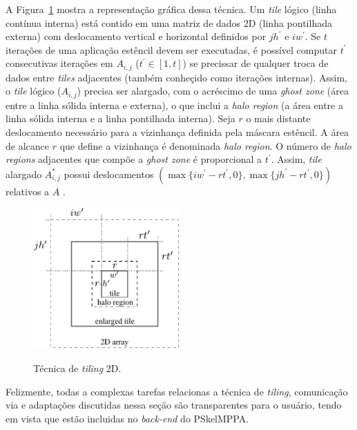 A Figura~\ref{fig:gputile} mostra a representação gráfica dessa técnica. Um \emph{tile} lógico (linha contínua interna) está contido em uma matriz de dados 2D (linha pontilhada externa) com deslocamento vertical e horizontal definidos por $j h^\prime$ e $i w^\prime$. Se $t$ iterações de uma aplicação estêncil devem ser executadas, é possível computar $t^\prime$ consecutivas iterações em $A_{i,j}$ ($t^\prime \in \left[1,t\right]$) se precissar de qualquer troca de dados entre \emph{tiles} adjacentes (também conheçido como iterações internas). Assim, o \emph{tile} lógico ($A_{i,j}$) precisa ser alargado, com o acréscimo de uma \emph{ghost zone} (área entre a linha sólida interna e externa), o que inclui a \emph{halo region} (a área entre a linha sólida interna e a linha pontilhada interna). Seja $r$ o mais distante deslocamento necessário para a vizinhança definida pela máscara estêncil. A área de alcance $r$ que define a vizinhança é denominada \textit{halo region}. O número de \emph{halo regions} adjacentes que compõe a \emph{ghost zone} é proporcional a $t^\prime$.
%
Assim, \emph{tile} alargado $A^\ast_{i,j}$ possui deslocamentos $(\max\{iw^\prime - rt^\prime, 0\}, \max\{jh^\prime - rt^\prime, 0\})$ relativos a $A$ \cite{Podesta:TCC}. 

\begin{figure}
	\centering
	\caption{Técnica de \textit{tiling} 2D.}
	\includegraphics[width=0.5\textwidth]{figs/tile.pdf} \\
	\label{fig:gputile}
\end{figure}

Felizmente, todas a complexas tarefas relacionas a técnica de \textit{tiling}, comunicação via \noc e adaptações discutidas nessa seção são transparentes para o usuário, tendo em vista que estão incluidas no \emph{back-end} do PSkelMPPA.